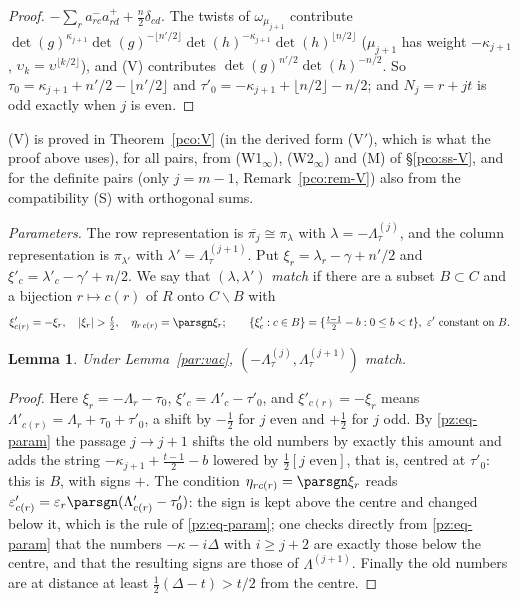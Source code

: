 \documentclass[10pt]{amsart}
\newtheorem{lemma}[theorem]{Lemma}
\theoremstyle{definition}
\theoremstyle{remark}
\begin{document}
\begin{proof}
$-\sum_ra^-_{rc}a^+_{rd}+\tfrac n2\delta_{cd}$. The twists of $\omega_{\mu_{j+1}}$ contribute
$\det(g)^{\kappa_{j+1}}\det(g)^{-\lfloor n'/2\rfloor}\det(h)^{-\kappa_{j+1}}\det(h)^{\lfloor n/2\rfloor}$
($\mu_{j+1}$ has weight $-\kappa_{j+1}$, $\upsilon_k=\upsilon^{\lfloor k/2\rfloor}$), and (V) contributes
$\det(g)^{n'/2}\det(h)^{-n/2}$. So $\tau_0=\kappa_{j+1}+n'/2-\lfloor n'/2\rfloor$ and
$\tau'_0=-\kappa_{j+1}+\lfloor n/2\rfloor-n/2$; and $N_j=r+jt$ is odd exactly when $j$ is even.
\end{proof}
(V) is proved in Theorem~\ref{pco:V} (in the derived form (V$'$), which is what the proof above
uses), for all pairs, from (W1$_\infty$), (W2$_\infty$) and (M) of \S\ref{pco:ss-V}, and for the
definite pairs (only $j=m-1$, Remark~\ref{pco:rem-V}) also from the compatibility (S) with
orthogonal sums.

\emph{Parameters.} The row representation is $\overline{\pi_j}\cong\pi_\lambda$ with
$\lambda=-\Lambda^{(j)}_\tau$, and the column representation is $\pi_{\lambda'}$ with
$\lambda'=\Lambda^{(j+1)}_\tau$. Put $\xi_r=\lambda_r-\gamma+n'/2$ and $\xi'_c=\lambda'_c-\gamma'+n/2$.
We say that $(\lambda,\lambda')$ \emph{match} if there are a subset $B\subset C$ and a bijection
$r\mapsto c(r)$ of $R$ onto $C\smallsetminus B$ with
\begin{equation}\label{par:eq-match}
\xi'_{c(r)}=-\xi_r,\quad|\xi_r|>\tfrac t2,\quad\eta_{r\,c(r)}=\parsgn\xi_r;\qquad
\{\xi'_c:c\in B\}=\{\tfrac{t-1}2-b:0\le b<t\},\ \varepsilon'\text{ constant on }B.
\end{equation}

\begin{lemma}\label{par:match}
Under Lemma~\ref{par:vac}, $(-\Lambda^{(j)}_\tau,\Lambda^{(j+1)}_\tau)$ match.
\end{lemma}
\begin{proof}
Here $\xi_r=-\Lambda_r-\tau_0$, $\xi'_c=\Lambda'_c-\tau'_0$, and $\xi'_{c(r)}=-\xi_r$ means
$\Lambda'_{c(r)}=\Lambda_r+\tau_0+\tau'_0$, a shift by $-\tfrac12$ for $j$ even and $+\tfrac12$ for $j$
odd. By \eqref{pz:eq-param} the passage $j\to j+1$ shifts the old numbers by exactly this amount and
adds the string $-\kappa_{j+1}+\tfrac{t-1}2-b$ lowered by $\tfrac12[j\text{ even}]$, that is, centred
at $\tau'_0$: this is $B$, with signs $+$. The condition $\eta_{rc(r)}=\parsgn\xi_r$ reads
$\varepsilon'_{c(r)}=\varepsilon_r\parsgn(\Lambda'_{c(r)}-\tau'_0)$: the sign is kept above the centre
and changed below it, which is the rule of \eqref{pz:eq-param}; one checks directly from
\eqref{pz:eq-param} that the numbers $-\kappa-i\Delta$ with $i\ge j+2$ are exactly those below the
centre, and that the resulting signs are those of $\Lambda^{(j+1)}$. Finally the old numbers are at
distance at least $\tfrac12(\Delta-t)>t/2$ from the centre.
\end{proof}
\end{document}

